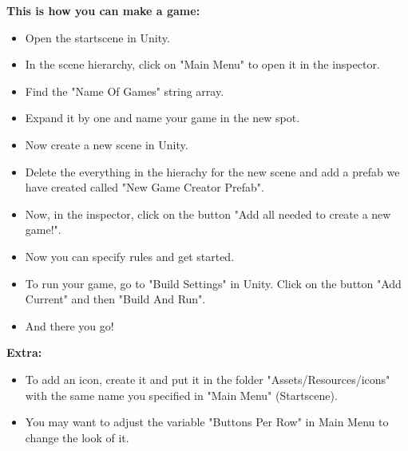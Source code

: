 	\textbf{This is how you can make a game:}
	\begin{itemize}
		\item Open the startscene in Unity.
		\item In the scene hierarchy, click on "Main Menu" to open it in the
			inspector.
		\item Find the "Name Of Games" string array.
		\item Expand it by one and name your game in the new spot.
		\item Now create a new scene in Unity.
		\item Delete the everything in the hierachy for the new scene and add
			a prefab we have created called "New Game Creator Prefab".
		\item Now, in the inspector, click on the button "Add all needed to
			create a new game!".
		\item Now you can specify rules and get started.
		\item To run your game, go to "Build Settings" in Unity. Click on the
			button "Add Current" and then "Build And Run".
		\item And there you go!
	\end{itemize}

	\textbf{Extra:}
	\begin{itemize}
		\item To add an icon, create it and put it in the folder 
			"Assets/Resources/icons" with the same name you specified in "Main 
			Menu" (Startscene).
		\item You may want to adjust the variable "Buttons Per Row" in Main
			Menu to change the look of it.
	\end{itemize}
